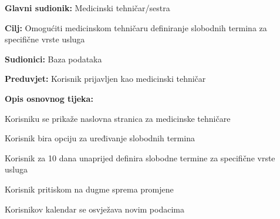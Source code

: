 					\noindent {}
					\begin{packed_item}
	
						\item \textbf{Glavni sudionik: } Medicinski tehničar/sestra
						\item  \textbf{Cilj:} Omogućiti medicinskom tehničaru definiranje slobodnih termina za specifične vrste usluga
						\item  \textbf{Sudionici:} Baza podataka
						\item  \textbf{Preduvjet:} Korisnik prijavljen kao medicinski tehničar
						\item  \textbf{Opis osnovnog tijeka:}
						
						\item[] \begin{packed_enum}
	
							\item Korisniku se prikaže naslovna stranica za medicinske tehničare
							\item Korisnik bira opciju za uređivanje slobodnih termina
							\item Korisnik za 10 dana unaprijed definira slobodne termine za specifične vrste usluga
							\item Korisnik pritiskom na dugme sprema promjene
							\item Korisnikov kalendar se osvježava novim podacima
						\end{packed_enum}
					\end{packed_item}
					
